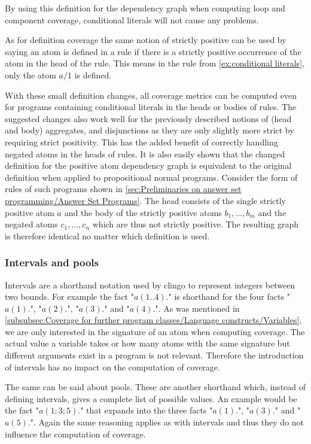 By using this definition for the dependency graph when computing loop and component coverage, conditional literals will not cause any problems.

As for definition coverage the same notion of strictly positive can be used by saying an atom is defined in a rule if there is a strictly positive occurrence of the atom in the head of the rule. This means in the rule from \cref{ex:conditional literals}, only the atom $a/1$ is defined.

With these small definition changes, all coverage metrics can be computed even for programs containing conditional literals in the heads or bodies of rules. The suggested changes also work well for the previously described notions of (head and body) aggregates, and disjunctions as they are only slightly more strict by requiring strict positivity. This has the added benefit of correctly handling negated atoms in the heads of rules. It is also easily shown that the changed definition for the positive atom dependency graph is equivalent to the original definition when applied to propositional normal programs. Consider the form of rules of such programs shown in \cref{sec:Preliminaries on answer set programming/Answer Set Programs}. The head consists of the single strictly positive atom $a$ and the body of the strictly positive atoms \(b_1, \ldots, b_m\) and the negated atoms \(c_1, \ldots, c_n\) which are thus not strictly positive. The resulting graph is therefore identical no matter which definition is used.


\subsubsection{Intervals and pools}
\label{subsubsec:Coverage for further program classes/Language constructs/Intervals and pools}
Intervals are a shorthand notation used by clingo to represent integers between two bounds. For example the fact "\(a(1..4).\)" is shorthand for the four facts "\(a(1).\)", "\(a(2).\)", "\(a(3).\)" and "\(a(4).\)". As was mentioned in \cref{subsubsec:Coverage for further program classes/Language constructs/Variables}, we are only interested in the signature of an atom when computing coverage. The actual value a variable takes or how many atoms with the same signature but different arguments exist in a program is not relevant. Therefore the introduction of intervals has no impact on the computation of coverage.

The same can be said about pools. These are another shorthand which, instead of defining intervals, gives a complete list of possible values. An example would be the fact "\(a(1;3;5).\)" that expands into the three facts "\(a(1).\)", "\(a(3).\)" and "\(a(5).\)". Again the same reasoning applies as with intervals and thus they do not influence the computation of coverage.

